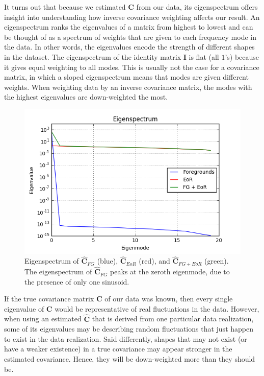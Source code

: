 \documentclass[preprint2,numberedappendix,tighten]{aastex6}  %
\begin{document}
It turns out that because we estimated $\textbf{C}$ from our data, its eigenspectrum offers insight into understanding how inverse covariance weighting affects our result. An eigenspectrum ranks the eigenvalues of a matrix from highest to lowest and can be thought of as a spectrum of weights that are given to each frequency mode in the data. In other words, the eigenvalues encode the strength of different shapes in the dataset. The eigenspectrum of the identity matrix $\textbf{I}$ is flat (all $1$'s) because it gives equal weighting to all modes. This is usually not the case for a covariance matrix, in which a sloped eigenspectrum means that modes are given different weights. When weighting data by an inverse covariance matrix, the modes with the highest eigenvalues are down-weighted the most. 

\begin{figure}
	\centering
	\includegraphics[trim={0.3cm 0.2cm 0.3cm 0.3cm},clip,width=\columnwidth]{plots/toy_sigloss2.png}
	\caption{Eigenspectrum of $\hat{\textbf{C}}_{FG}$ (blue), $\hat{\textbf{C}}_{EoR}$ (red), and $\hat{\textbf{C}}_{FG+EoR}$ (green). The eigenspectrum of $\hat{\textbf{C}}_{FG}$ peaks at the zeroth eigenmode, due to the presence of only one sinusoid.}
	\label{fig:toy_sigloss2}
\end{figure}

If the true covariance matrix $\textbf{C}$ of our data was known, then every single eigenvalue of $\textbf{C}$ would be representative of real fluctuations in the data. However, when using an estimated $\hat{\textbf{C}}$ that is derived from one particular data realization, some of its eigenvalues may be describing random fluctuations that just happen to exist in the data realization. Said differently, shapes that may not exist (or have a weaker existence) in a true covariance may appear stronger in the estimated covariance. Hence, they will be down-weighted more than they should be.
\end{document}

